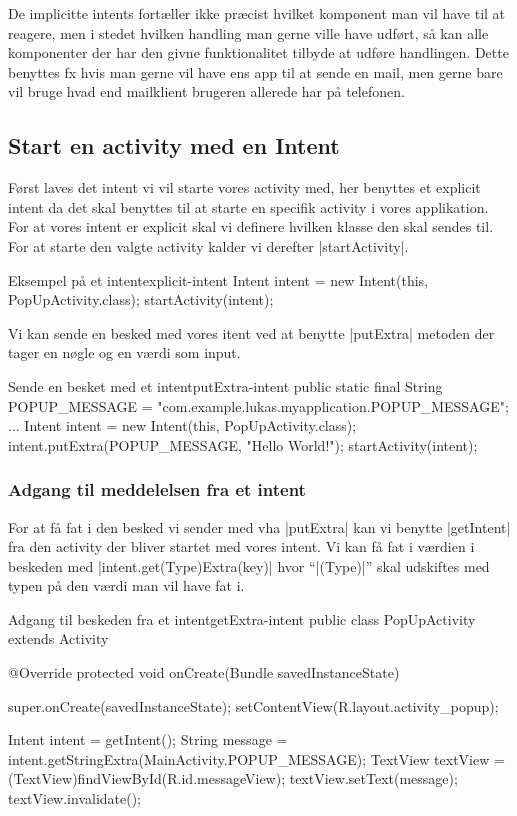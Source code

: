 De implicitte intents fortæller ikke præcist hvilket komponent man vil have til at reagere, men i stedet hvilken handling man gerne ville have udført, så kan alle komponenter der har den givne funktionalitet tilbyde at udføre handlingen. Dette benyttes fx hvis man gerne vil have ens app til at sende en mail, men gerne bare vil bruge hvad end mailklient brugeren allerede har på telefonen.

\subsection{Start en activity med en Intent}

Først laves det intent vi vil starte vores activity med, her benyttes et explicit intent da det skal benyttes til at starte en specifik activity i vores applikation. For at vores intent er explicit skal vi definere hvilken klasse den skal sendes til. For at starte den valgte activity kalder vi derefter \JavaInline|startActivity|.

\begin{JavaCode}{Eksempel på et intent}{explicit-intent}
	Intent intent = new Intent(this, PopUpActivity.class);
	startActivity(intent);
\end{JavaCode}

Vi kan sende en besked med vores itent ved at benytte \JavaInline|putExtra| metoden der tager en nøgle og en værdi som input.

\begin{JavaCode}{Sende en besket med et intent}{putExtra-intent}
	public static final String POPUP_MESSAGE = "com.example.lukas.myapplication.POPUP_MESSAGE";
	...
	Intent intent = new Intent(this, PopUpActivity.class);
	intent.putExtra(POPUP_MESSAGE, "Hello World!");
	startActivity(intent);
\end{JavaCode}

\subsubsection{Adgang til meddelelsen fra et intent}

For at få fat i den besked vi sender med vha \JavaInline|putExtra| kan vi benytte \JavaInline|getIntent| fra den activity der bliver startet med vores intent. Vi kan få fat i værdien i beskeden med \JavaInline|intent.get(Type)Extra(key)|  hvor ``\JavaInline|(Type)|'' skal udskiftes med typen på den værdi man vil have fat i.

\begin{JavaCode}{Adgang til beskeden fra et intent}{getExtra-intent}
	public class PopUpActivity extends Activity {
		
		@Override
		protected void onCreate(Bundle savedInstanceState) {
			super.onCreate(savedInstanceState);
			setContentView(R.layout.activity_popup);
			
			Intent intent = getIntent();
			String message = intent.getStringExtra(MainActivity.POPUP_MESSAGE);
			TextView textView = (TextView)findViewById(R.id.messageView);
			textView.setText(message);
			textView.invalidate();
		}
	}
\end{JavaCode}

